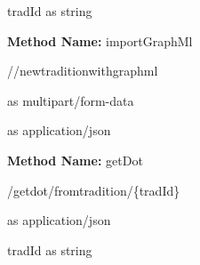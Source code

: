 \begin{parameter}
tradId as string
\end{parameter}
\textbf{Method Name: }importGraphMl
\begin{post}
//newtraditionwithgraphml
\end{post}
\begin{request}
 as multipart/form-data
\end{request}
\begin{response}
 as application/json
\end{response}
\textbf{Method Name: }getDot
\begin{get}
/getdot/fromtradition/\{tradId\}
\end{get}
\begin{response}
 as application/json
\end{response}
\begin{parameter}
tradId as string
\end{parameter}
